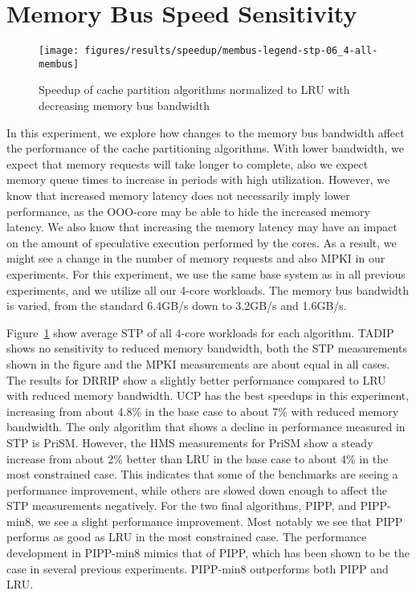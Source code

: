 \section{Memory Bus Speed Sensitivity}
\label{sec:results:bus_sensitivity}


\begin{figure}[th]
    \centering
    \texttt{[image: figures/results/speedup/membus-legend-stp-06\_4-all-membus]}
    \caption[Speedup with decreasing bus bandwidth]{Speedup of cache partition algorithms normalized to LRU with decreasing memory bus bandwidth}
    \label{fig:results:bus}
\end{figure}

In this experiment, we explore how changes to the memory bus bandwidth affect the performance of the cache partitioning algorithms.
With lower bandwidth, we expect that memory requests will take longer to complete, also we expect memory queue times to increase in periods with high utilization.
However, we know that increased memory latency does not necessarily imply lower performance, as the OOO-core may be able to hide the increased memory latency.
We also know that increasing the memory latency may have an impact on the amount of speculative execution performed by the cores.
As a result, we might see a change in the number of memory requests and also MPKI in our experiments.
For this experiment, we use the same base system as in all previous experiments, and we utilize all our 4-core workloads.
The memory bus bandwidth is varied, from the standard 6.4GB/s down to 3.2GB/s and 1.6GB/s.

Figure~\ref{fig:results:bus} show average STP of all 4-core workloads for each algorithm.
TADIP shows no sensitivity to reduced memory bandwidth, both the STP measurements shown in the figure and the MPKI measurements are about equal in all cases.
The results for DRRIP show a slightly better performance compared to LRU with reduced memory bandwidth.
UCP has the best speedups in this experiment, increasing from about 4.8\% in the base case to about 7\% with reduced memory bandwidth.
The only algorithm that shows a decline in performance measured in STP is PriSM.
However, the HMS measurements for PriSM show a steady increase from about 2\% better than LRU in the base case to about 4\% in the most constrained case.
This indicates that some of the benchmarks are seeing a performance improvement, while others are slowed down enough to affect the STP measurements negatively.
For the two final algorithms, PIPP, and PIPP-min8, we see a slight performance improvement.
Most notably we see that PIPP performs as good as LRU in the most constrained case.
The performance development in PIPP-min8 mimics that of PIPP, which has been shown to be the case in several previous experiments.
PIPP-min8 outperforms both PIPP and LRU.

